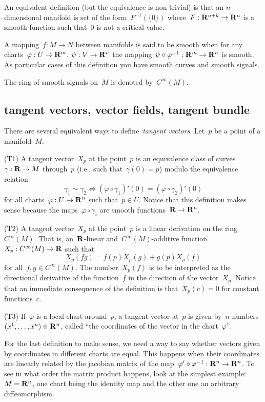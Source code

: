 An equivalent definition (but the equivalence is non-trivial) is that an
$n$-dimensional manifold is set of the form~$F^{-1}(\{0\})$
where~$F:\mathbf{R}^{n+k}\to\mathbf{R}^n$ is a smooth function such that~$0$ is not a
critical value.

A mapping~$f:M\to N$ between manifolds is said to be smooth when for any
charts~$\varphi:U\to\mathbf{R}^m$, $\psi:V\to\mathbf{R}^n$ the
mapping~$\psi\circ\varphi^{-1}:\mathbf{R}^m\to\mathbf{R}^n$ is smooth.
As particular cases  of this definition you have smooth curves and smooth
signals.

The ring of smooth signals on~$M$ is denoted by~$C^\infty(M)$.

\subsection{tangent vectors, vector fields, tangent bundle}

There are several equivalent ways to define~\emph{tangent vectors}.
Let~$p$ be a point of a manifold~$M$.

(T1) A tangent vector~$X_p$ at the point~$p$ is an equivalence class of
curves~$\gamma:\mathbf{R}\to M$ through~$p$ (i.e., such that~$\gamma(0)=p$)
modulo the equivalence relation
\[
	\gamma_1\sim\gamma_2
	\iff
		(\varphi\circ\gamma_1)'(0)=(\varphi\circ\gamma_2)'(0)
\]
for all charts~$\varphi:U\to\mathbf{R}^n$ such that~$p\in U$.  Notice that this
definition makes sense because the maps~$\varphi\circ\gamma_i$ are smooth
functions~$\mathbf{R}\to\mathbf{R}^n$.

(T2) A tangent vector~$X_p$ at the point~$p$ is a linear derivation on the
ring~$C^\infty(M)$.  That is, an~$\mathbf{R}$-linear and~$C^\infty(M)$-additive
function~$X_p:C^\infty(M)\to\mathbf{R}$ such that
\[
	X_p(fg)=f(p)X_p(g) + g(p)X_p(f)
\]
for all~$f,g\in C^\infty(M)$.  The number~$X_p(f)$ is to be interpreted as
the directional derivative of the function~$f$ in the direction of the
vector~$X_p$.  Notice that an immediate consequence of the definition is
that~$X_p(c)=0$ for constant functions~$c$.

(T3) If~$\varphi$ is a local chart around~$p$, a tangent vector at~$p$ is
given by~$n$ numbers~$(x^1,\ldots,x^n)\in\mathbf{R}^n$, called ``the coordinates of
the vector in the chart~$\varphi$''.

For the last definition to make sense, we need a way to say whether vectors
given by coordinates in different charts are equal.  This happens when their
coordinates are linearly related by the jacobian matrix of the
map~$\varphi'\circ\varphi^{-1}:\mathbf{R}^n\to\mathbf{R}^n$.  To see in what order the matrix
product happens, look at the simplest example:~$M=\mathbf{R}^n$, one chart being the
identity map and the other one an arbitrary diffeomorphism.


